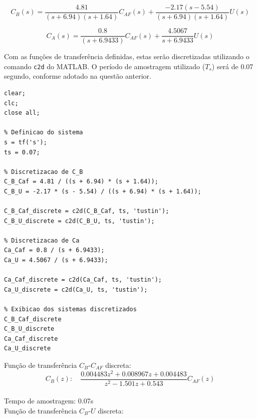 \documentclass[a4paper,12pt]{article}
\begin{document}
\begin{equation}
C_B(s) = \frac{4.81}{(s+6.94)(s+1.64)}C_{AF}(s) +\frac{-2.17(s-5.54)}{(s+6.94)(s+1.64)} U(s)
\label{eq:planta_cb}
\end{equation}

\begin{equation}
C_A(s) = \frac{0.8}{(s+6.9433)}C_{AF}(s) +\frac{4.5067}{s+6.9433} U(s)
\label{eq:planta_ca}
\end{equation}

Com as funções de transferência definidas, estas serão discretizadas utilizando o comando \texttt{c2d} do MATLAB. O período de amostragem utilizado (\(T_s\)) será de 0.07 segundo, conforme adotado na questão anterior.\\



\begin{lstlisting}
clear;
clc;
close all;

% Definicao do sistema
s = tf('s');
ts = 0.07;

% Discretizacao de C_B
C_B_Caf = 4.81 / ((s + 6.94) * (s + 1.64));
C_B_U = -2.17 * (s - 5.54) / ((s + 6.94) * (s + 1.64));

C_B_Caf_discrete = c2d(C_B_Caf, ts, 'tustin');
C_B_U_discrete = c2d(C_B_U, ts, 'tustin');

% Discretizacao de Ca
Ca_Caf = 0.8 / (s + 6.9433);
Ca_U = 4.5067 / (s + 6.9433);

Ca_Caf_discrete = c2d(Ca_Caf, ts, 'tustin');
Ca_U_discrete = c2d(Ca_U, ts, 'tustin');

% Exibicao dos sistemas discretizados
C_B_Caf_discrete
C_B_U_discrete
Ca_Caf_discrete
Ca_U_discrete
\end{lstlisting}


Função de transferência \(C_B\)-\(C_{AF}\) discreta:\\

\begin{equation}
C_B(z): \quad \frac{0.004483 z^2 + 0.008967 z + 0.004483}{z^2 - 1.501 z + 0.543}C_{AF}(z)
\end{equation}\\

Tempo de amostragem: 0.07s\\

Função de transferência \(C_B\)-\(U\) discreta:
\end{document}
